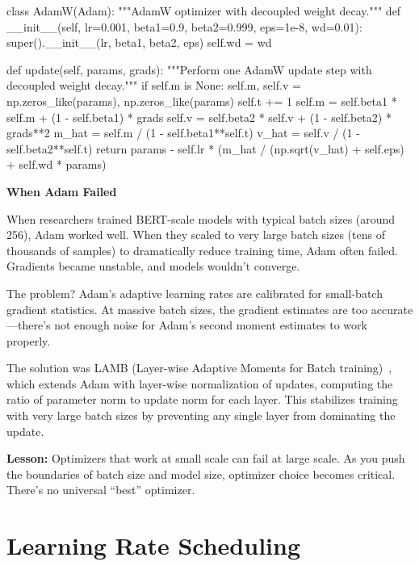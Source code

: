 \documentclass[../../main.tex]{subfiles}
\begin{document}
\begin{pythoncode}
class AdamW(Adam):
    """AdamW optimizer with decoupled weight decay."""
    def __init__(self, lr=0.001, beta1=0.9, beta2=0.999, eps=1e-8, wd=0.01):
        super().__init__(lr, beta1, beta2, eps)
        self.wd = wd

    def update(self, params, grads):
        """Perform one AdamW update step with decoupled weight decay."""
        if self.m is None:
            self.m, self.v = np.zeros_like(params), np.zeros_like(params)
        self.t += 1
        self.m = self.beta1 * self.m + (1 - self.beta1) * grads
        self.v = self.beta2 * self.v + (1 - self.beta2) * grads**2
        m_hat = self.m / (1 - self.beta1**self.t)
        v_hat = self.v / (1 - self.beta2**self.t)
        return params - self.lr * (m_hat / (np.sqrt(v_hat) + self.eps) + self.wd * params)
\end{pythoncode}

\begin{warstory}
\textbf{When Adam Failed}

When researchers trained BERT-scale models with typical batch sizes (around 256), Adam worked well. When they scaled to very large batch sizes (tens of thousands of samples) to dramatically reduce training time, Adam often failed. Gradients became unstable, and models wouldn't converge.

The problem? Adam's adaptive learning rates are calibrated for small-batch gradient statistics. At massive batch sizes, the gradient estimates are too accurate---there's not enough noise for Adam's second moment estimates to work properly.

The solution was LAMB (Layer-wise Adaptive Moments for Batch training)~\cite{you2019lamb}, which extends Adam with layer-wise normalization of updates, computing the ratio of parameter norm to update norm for each layer. This stabilizes training with very large batch sizes by preventing any single layer from dominating the update.

\textbf{Lesson:} Optimizers that work at small scale can fail at large scale. As you push the boundaries of batch size and model size, optimizer choice becomes critical. There's no universal ``best'' optimizer.
\end{warstory}

\section{Learning Rate Scheduling}
\label{sec:lr-scheduling}
\end{document}
